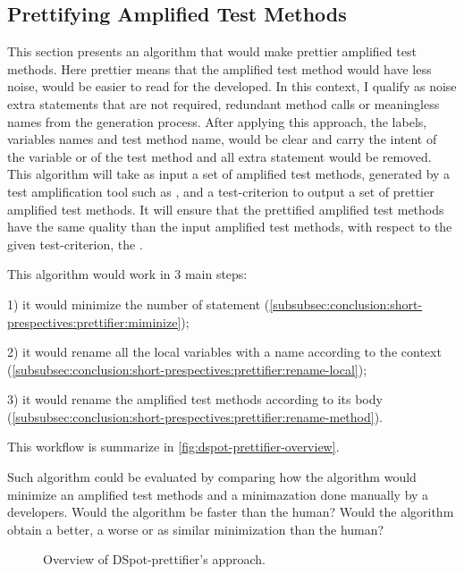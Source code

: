 \subsection{Prettifying Amplified Test Methods}
\label{subsec:conclusion:short-prespectives:prettifier}

This section presents an algorithm that would make prettier amplified test methods.
Here prettier means that the amplified test method would have less noise, \ie would be easier to read for the developed.
In this context, I qualify as noise extra statements that are not required, redundant method calls or meaningless names from the generation process.
After applying this approach, the labels, \ie variables names and test method name, would be clear and carry the intent of the variable or of the test method and all extra statement would be removed.
This algorithm will take as input a set of amplified test methods, generated by a test amplification tool such as \dspot, and a test-criterion to output a set of prettier amplified test methods.
It will ensure that the prettified amplified test methods have the same quality than the input amplified test methods, with respect to the given test-criterion, \eg the \ms.

This algorithm would work in 3 main steps:

1) it would minimize the number of statement (\autoref{subsubsec:conclusion:short-prespectives:prettifier:miminize});

2) it would rename all the local variables with a name according to the context (\autoref{subsubsec:conclusion:short-prespectives:prettifier:rename-local});

3) it would rename the amplified test methods according to its body (\autoref{subsubsec:conclusion:short-prespectives:prettifier:rename-method}).

This workflow is summarize in \autoref{fig:dspot-prettifier-overview}.

Such algorithm could be evaluated by comparing how the algorithm would minimize an amplified test methods and a minimazation done manually by a developers.
Would the algorithm be faster than the human?
Would the algorithm obtain a better, a worse or as similar minimization than the human?

\begin{figure}
	\label{fig:dspot-prettifier-overview}
	\caption{Overview of DSpot-prettifier's approach.}
\end{figure}

